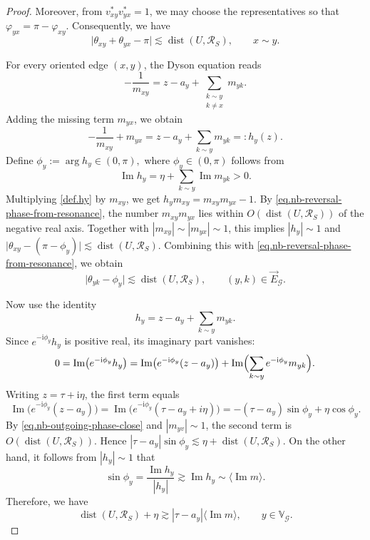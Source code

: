 \documentclass[11pt,twoside, a4paper]{article}
\numberwithin{equation}{section}
\numberwithin{figure}{section}
\theoremstyle{plain} %
\theoremstyle{definition}
\theoremstyle{remark}
\newcommand{\1} {\mspace{1 mu}}
\newcommand{\2} {\mspace{2 mu}}
\DeclareMathOperator{\im}{Im}
\DeclareMathOperator{\dist}{dist}
\begin{document}
\begin{proof}
Moreover, from \(v^*_{xy}v^*_{yx}=1\), we may choose the representatives so that
$
    \varphi_{yx}=\pi-\varphi_{xy}.
$
Consequently, we have
\begin{equation}\label{eq.nb-reversal-phase-from-resonance}
    \big|
    \theta_{xy}+\theta_{yx}-\pi
    \big|
    \lesssim
    \dist(U,\mathscr{R}_S),
    \qquad x\sim y.
\end{equation}

For every oriented edge \((x,y)\), the Dyson equation reads
\[
    -\frac1{m_{xy}}
    =
    z-a_y+\sum_{\substack{k\sim y\\ k\neq x}}m_{yk}.
\]
Adding the missing term \(m_{yx}\), we obtain
\begin{equation}\label{def.hy}
    -\frac1{m_{xy}}+m_{yx}
    =
    z-a_y+\sum_{k\sim y}m_{yk}
    =:h_y(z).
\end{equation}
Define 
$
    \phi_y:=\arg h_y\in(0,\pi),
$
where \(\phi_y\in(0,\pi)\) follows from
\[
    \im h_y
    =
    \eta+\sum_{k\sim y}\im m_{yk}
    >0.
\]
Multiplying \eqref{def.hy} by \(m_{xy}\), we get
$
    h_y m_{xy}
    =
    m_{xy}m_{yx}-1.
$
By \eqref{eq.nb-reversal-phase-from-resonance}, the number
\(m_{xy}m_{yx}\) lies within \(O(\dist(U,\mathscr{R}_S))\) of the negative real axis.
Together with \(|m_{xy}|\sim |m_{yx}|\sim1\), this implies
$
    |h_y|\sim 1
$
and
$
    \big|\theta_{xy}-(\pi-\phi_y)\big|
    \lesssim
    \dist(U,\mathscr{R}_S).
$
Combining this with \eqref{eq.nb-reversal-phase-from-resonance}, we obtain
\begin{equation}\label{eq.nb-outgoing-phase-close}
    \big|\theta_{yk}-\phi_y\big|
    \lesssim
    \dist(U,\mathscr{R}_S),
    \qquad (y,k)\in\vec E_{\mathcal G}.
\end{equation}

Now use the identity
\[
    h_y=z-a_y+\sum_{k\sim y}m_{yk}.
\]
Since \(e^{-\mathrm i\phi_y}h_y\) is positive real, its imaginary part vanishes:
\[
    0
    =
    \im\bigl(e^{-\mathrm i\phi_y}h_y\bigr)
    =
    \im\bigl(e^{-\mathrm i\phi_y}(z-a_y)\bigr)
    +
    \im\Bigl(\sum_{k\sim y}e^{-\mathrm i\phi_y}m_{yk}\Bigr).
\]
Writing \(z=\tau+\mathrm i\eta\), the first term equals
    \[
        \im\big(e^{-\mathrm i\phi_y}(z-a_y)\big)
        =
        \im\big(e^{-\mathrm i\phi_y}(\tau-a_y+i\eta)\big)
        =
        -(\tau-a_y)\sin\phi_y+\eta\cos\phi_y.
    \]
By \eqref{eq.nb-outgoing-phase-close} and \(|m_{yv}|\sim1\), the second term is \(O(\dist(U,\mathscr{R}_S))\). Hence
$
    |\tau-a_y|\sin\phi_y
    \lesssim
    \eta+\dist(U,\mathscr{R}_S).
$
On the other hand, it follows from $|h_y|\sim 1$ that 
\[
    \sin\phi_y
    =
    \frac{\im h_y}{|h_y|}
    \gtrsim
    \im h_y
    \sim
    \langle\im m\rangle .
\]
Therefore, we have
\begin{equation}\label{eq.nb-delta-eta-controls-tau-ay}
    \dist(U,\mathscr{R}_S)+\eta
    \gtrsim
    |\tau-a_y|\langle\im m\rangle,
    \qquad y\in \mathbb{V}_{\mathcal G}.
\end{equation}


\end{proof}
\end{document}
